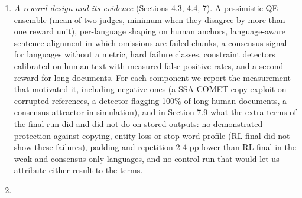 \begin{enumerate}
\def\labelenumi{\arabic{enumi}.}
\tightlist
\item
  \emph{A reward design and its evidence} (Sections 4.3, 4.4, 7). A pessimistic QE ensemble (mean of two judges, minimum when they disagree by more than one reward unit), per-language shaping on human anchors, language-aware sentence alignment in which omissions are failed chunks, a consensus signal for languages without a metric, hard failure classes, constraint detectors calibrated on human text with measured false-positive rates, and a second reward for long documents. For each component we report the measurement that motivated it, including negative ones (a SSA-COMET copy exploit on corrupted references, a detector flagging 100\% of long human documents, a consensus attractor in simulation), and in Section 7.9 what the extra terms of the final run did and did not do on stored outputs: no demonstrated protection against copying, entity loss or stop-word profile (RL-final did not show these failures), padding and repetition 2-4 pp lower than RL-final in the weak and consensus-only languages, and no control run that would let us attribute either result to the terms.
\item

\end{enumerate}
